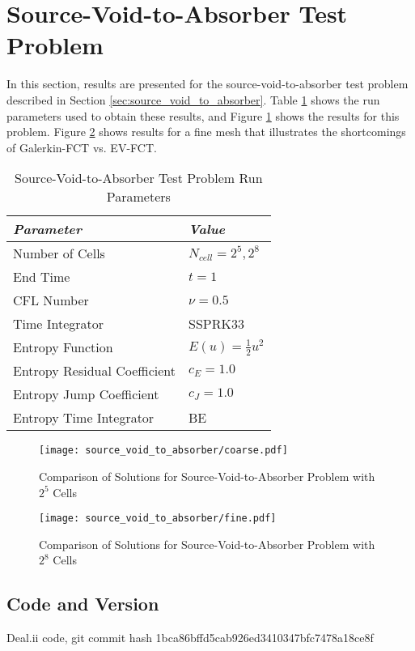 \section{Source-Void-to-Absorber Test Problem}

In this section, results are presented for the
source-void-to-absorber test problem
described in Section \ref{sec:source_void_to_absorber}.
Table \ref{tab:source_void_to_absorber_run_parameters}
shows the run parameters used
to obtain these results, and Figure \ref{fig:source_void_to_absorber}
shows the results for this problem. Figure
\ref{fig:source_void_to_absorber_fine} shows results
for a fine mesh that illustrates the shortcomings of Galerkin-FCT
vs. EV-FCT.

\begin{table}[h]\caption{Source-Void-to-Absorber Test Problem Run Parameters}
\label{tab:source_void_to_absorber_run_parameters}
\centering
\begin{tabular}{l l}\toprule
\emph{Parameter} & \emph{Value}\\\midrule
Number of Cells & $N_{cell} = 2^5, 2^8$\\
End Time & $t = 1$\\
CFL Number & $\nu = 0.5$\\
Time Integrator & SSPRK33\\\midrule
Entropy Function & $E(u) = \frac{1}{2}u^2$\\
Entropy Residual Coefficient & $c_E = 1.0$\\
Entropy Jump Coefficient & $c_J = 1.0$\\
Entropy Time Integrator & BE\\
\bottomrule\end{tabular}
\end{table}
\begin{figure}[h]
   \texttt{[image: source\_void\_to\_absorber/coarse.pdf]}
   \caption{Comparison of Solutions for Source-Void-to-Absorber Problem
     with $2^5$ Cells}
   \label{fig:source_void_to_absorber}
\end{figure}
\begin{figure}[h]
   \texttt{[image: source\_void\_to\_absorber/fine.pdf]}
   \caption{Comparison of Solutions for Source-Void-to-Absorber Problem
     with $2^8$ Cells}
   \label{fig:source_void_to_absorber_fine}
\end{figure}
\subsection{Code and Version}
Deal.ii code, git commit hash 1bca86bffd5cab926ed3410347bfc7478a18ce8f

